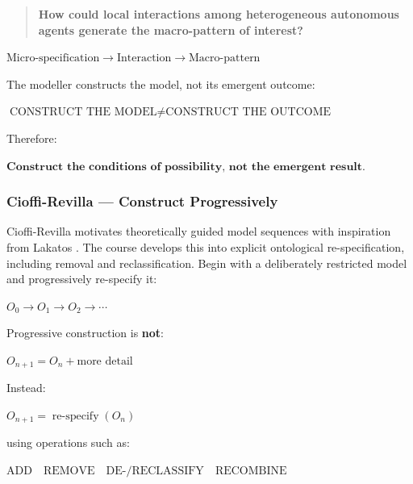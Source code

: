\documentclass[11pt,a4paper]{article}
\newenvironment{fitdisplay}{\par\medskip\noindent\begin{lrbox}{\displaybox}$\displaystyle}{%
$\end{lrbox}\makebox[\linewidth][c]{\ifdim\wd\displaybox>\linewidth\resizebox{\linewidth}{!}{\usebox{\displaybox}}\else\usebox{\displaybox}\fi}\par\medskip}
\begin{document}
\begin{quote}
\textbf{How could local interactions among heterogeneous autonomous agents generate the macro-pattern of interest?}
\end{quote}

\begin{fitdisplay}
\boxed{
\text{Micro-specification}
\rightarrow
\text{Interaction}
\rightarrow
\text{Macro-pattern}
}
\end{fitdisplay}

The modeller constructs the model, not its emergent outcome:

\begin{fitdisplay}
\boxed{
\text{CONSTRUCT THE MODEL}
\neq
\text{CONSTRUCT THE OUTCOME}
}
\end{fitdisplay}

Therefore:

\begin{fitdisplay}
\boxed{\textbf{Construct the conditions of possibility, not the emergent result.}}
\end{fitdisplay}

\subsubsection{Cioffi-Revilla --- Construct Progressively}

Cioffi-Revilla motivates theoretically guided model sequences with inspiration from Lakatos \cite{cioffi}. The course develops this into explicit ontological re-specification, including removal and reclassification. Begin with a deliberately restricted model and progressively re-specify it:

\begin{fitdisplay}
\boxed{
O_0\rightarrow O_1\rightarrow O_2\rightarrow\cdots
}
\end{fitdisplay}

Progressive construction is \textbf{not}:

\begin{fitdisplay}
O_{n+1}=O_n+\text{more detail}
\end{fitdisplay}

Instead:

\begin{fitdisplay}
\boxed{
O_{n+1}=\operatorname{re-specify}(O_n)
}
\end{fitdisplay}

using operations such as:

\begin{fitdisplay}
\boxed{
\text{ADD}
\quad
\text{REMOVE}
\quad
\text{DE-/RECLASSIFY}
\quad
\text{RECOMBINE}
}
\end{fitdisplay}
\end{document}
